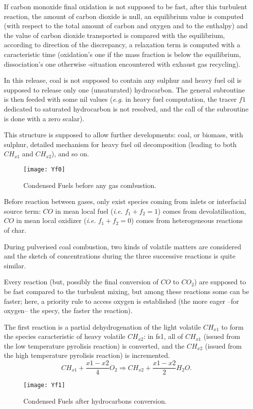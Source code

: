 If carbon monoxide final oxidation is not supposed to be fast, after this
turbulent reaction, the amount of carbon dioxide is null, an equilibrium value
is computed (with respect to the total amount of carbon and oxygen and to the
enthalpy) and the value of carbon dioxide transported is compared with the
equilibrium, according to direction of the discrepancy, a relaxation term is
computed with a caracteristic time (oxidation's one if the mass fraction is
below the equilibrium, dissociation's one otherwise -situation encountered with
exhaust gas recycling).

In this release, coal is not supposed to contain any sulphur and heavy fuel
oil is supposed to release only one (unsaturated) hydrocarbon. The general
subroutine is then feeded with some nil values (\emph{e.g.} in heavy fuel computation,
the tracer $f1$ dedicated to saturated hydrocarbon is not resolved, and the call
of the subroutine is done with a zero scalar).

This structure is supposed to allow further developments: coal, or biomass,
with sulphur, detailed mechanism for heavy fuel oil decomposition (leading to
both $CH_{x1}$ and $CH_{x2}$), and so on.

\begin{figure}[!htpb]
\centerline{\texttt{[image: Yf0]}}
\caption{Condensed Fuels before any gas combustion.}
\end{figure}
Before reaction between gases, only exist species coming from
inlets or interfacial source term: $CO$ in mean local fuel (\emph{i.e.} $f_1+f_2=1$)
comes from devolatilisation, $CO$ in mean local oxidizer (\emph{i.e.} $f_1+f_2=0$)
comes from heterogeneous reactions of char.

During pulverised coal combustion, two kinds of volatile matters are considered
and the sketch of concentrations during the three successive reactions is quite
similar.

Every reaction (but, possibly the final conversion of $CO$ to $CO_{2}$) are
supposed to be fast compared to the turbulent mixing, but among these reactions
some can be faster; here, a priority rule to access oxygen is established (the
more eager --for oxygen-- the specy, the faster the reaction).

The first reaction is a partial dehydrogenation of the light volatile $CH_{x1}$
to form the species caracteristic of heavy volatile $CH_{x2}$: in fs1, all of
$CH_{x1}$ (issued from the low temperature pyrolisis reaction) is converted, and
the $CH_{x2}$ (issued from the high temperature pyrolisis reaction) is
incremented.
\begin{equation*}
CH_{x1} + \dfrac{x1-x2}{4} O_{2}  \Rightarrow  CH_{x2} + \dfrac{x1-x2}{2} H_{2}O .
\end{equation*}
\begin{figure}[!htpb]
\centerline{\texttt{[image: Yf1]}}
\caption{Condensed Fuels after hydrocarbons conversion.}
\end{figure}

